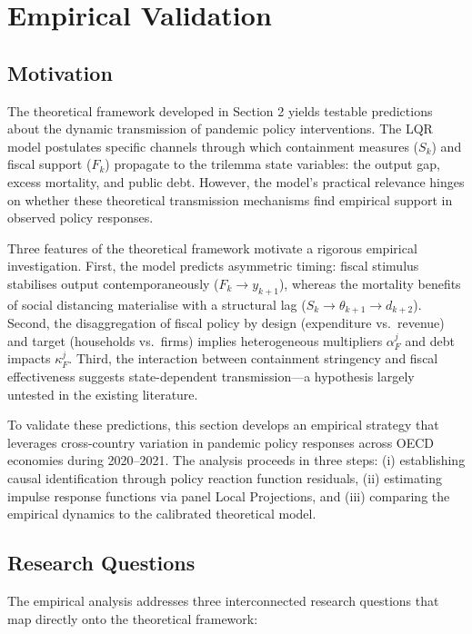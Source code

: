 \documentclass[12pt, a4paper]{article}
\begin{document}
\newpage

\section{Empirical Validation}

\subsection{Motivation}

The theoretical framework developed in Section 2 yields testable predictions about the dynamic transmission of pandemic policy interventions. The LQR model postulates specific channels through which containment measures ($S_k$) and fiscal support ($F_k$) propagate to the trilemma state variables: the output gap, excess mortality, and public debt. However, the model's practical relevance hinges on whether these theoretical transmission mechanisms find empirical support in observed policy responses.

Three features of the theoretical framework motivate a rigorous empirical investigation. First, the model predicts asymmetric timing: fiscal stimulus stabilises output contemporaneously ($F_k \to y_{k+1}$), whereas the mortality benefits of social distancing materialise with a structural lag ($S_k \to \theta_{k+1} \to d_{k+2}$). Second, the disaggregation of fiscal policy by design (expenditure vs.\ revenue) and target (households vs.\ firms) implies heterogeneous multipliers $\alpha^j_F$ and debt impacts $\kappa^j_F$. Third, the interaction between containment stringency and fiscal effectiveness suggests state-dependent transmission—a hypothesis largely untested in the existing literature.

To validate these predictions, this section develops an empirical strategy that leverages cross-country variation in pandemic policy responses across OECD economies during 2020--2021. The analysis proceeds in three steps: (i) establishing causal identification through policy reaction function residuals, (ii) estimating impulse response functions via panel Local Projections, and (iii) comparing the empirical dynamics to the calibrated theoretical model.

\subsection{Research Questions}

The empirical analysis addresses three interconnected research questions that map directly onto the theoretical framework:
\end{document}
